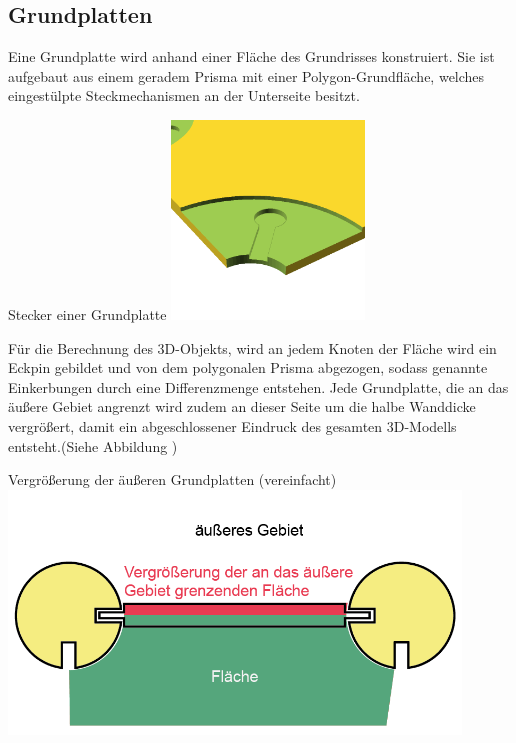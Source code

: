 \subsection{Grundplatten}
\label{gr}
Eine Grundplatte wird anhand einer Fläche des Grundrisses konstruiert.
Sie ist aufgebaut aus einem geradem Prisma mit einer Polygon-Grundfläche, welches eingestülpte Steckmechanismen an der Unterseite besitzt.
\begin{Bild}{Stecker einer Grundplatte}
	\includegraphics[height=200px]{Bilder/Untereinheit_GP}
\end{Bild}
Für die Berechnung des 3D-Objekts, wird an jedem Knoten der Fläche wird ein Eckpin gebildet und von dem polygonalen Prisma abgezogen, sodass genannte Einkerbungen durch eine Differenzmenge entstehen. 
Jede Grundplatte, die an das äußere Gebiet angrenzt wird zudem an dieser Seite um die halbe Wanddicke vergrößert, damit ein abgeschlossener Eindruck des gesamten 3D-Modells entsteht.(Siehe Abbildung \thebildnrnext)
\begin{Bild}{Vergrößerung der äußeren Grundplatten (vereinfacht)}
	\includegraphics[width=120mm]{Bilder/GrundplatteVergroesserung-08}
\end{Bild}

